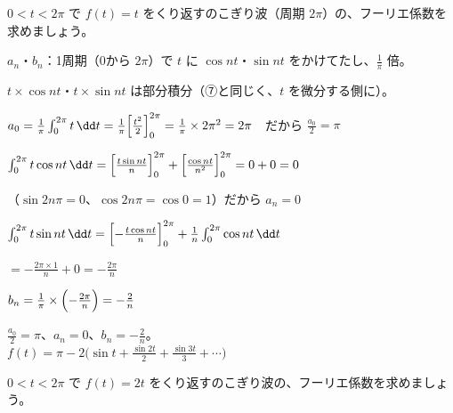 \begin{reidai}[$0$ から $2\pi$ ののこぎり波]
$0<t<2\pi$ で $f(t)=t$ をくり返すのこぎり波（周期 $2\pi$）の、フーリエ係数を求めましょう。\par
\kangaekata {}\par
{}\enspace $a_n$・$b_n$：1周期（0から $2\pi$）で $t$ に $\cos nt$・$\sin nt$ をかけてたし、$\frac{1}{\pi}$ 倍。\par
{}\enspace $t\times\cos nt$・$t\times\sin nt$ は部分積分（⑦と同じく、$t$ を微分する側に）。\par
\shiki\kixbs $a_0=\frac{1}{\pi}\int_0^{2\pi}t\,\dd t=\frac{1}{\pi}\Bigl[\frac{t^2}{2}\Bigr]_0^{2\pi}=\frac{1}{\pi}\times2\pi^2=2\pi$　だから $\frac{a_0}{2}=\pi$\par
\kixba $\int_0^{2\pi}t\cos nt\,\dd t=\Bigl[\frac{t\sin nt}{n}\Bigr]_0^{2\pi}+\Bigl[\frac{\cos nt}{n^2}\Bigr]_0^{2\pi}=0+0=0$\par
\kixbb （$\sin2n\pi=0$、$\cos2n\pi=\cos0=1$）だから $a_n=0$\par
\kixba $\int_0^{2\pi}t\sin nt\,\dd t=\Bigl[-\frac{t\cos nt}{n}\Bigr]_0^{2\pi}+\frac{1}{n}\int_0^{2\pi}\cos nt\,\dd t$\par
\kixbb $=-\frac{2\pi\times1}{n}+0=-\frac{2\pi}{n}$\par
\kixba $b_n=\frac{1}{\pi}\times\Bigl(-\frac{2\pi}{n}\Bigr)=-\frac{2}{n}$\par
\kotae $\frac{a_0}{2}=\pi$、$a_n=0$、$b_n=-\frac{2}{n}$。\\
\hspace*{2.6\zw}$f(t)=\pi-2\bigl(\sin t+\frac{\sin2t}{2}+\frac{\sin3t}{3}+\cdots\bigr)$
\end{reidai}

\begin{jibun}
$0<t<2\pi$ で $f(t)=2t$ をくり返すのこぎり波の、フーリエ係数を求めましょう。
\end{jibun}

